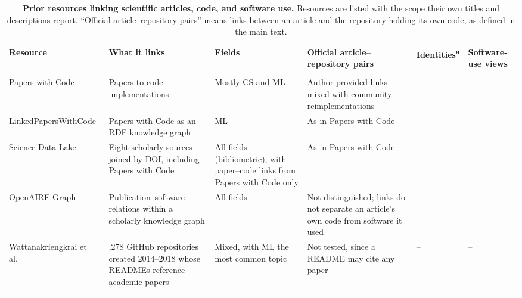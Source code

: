 \documentclass[pdflatex,sn-nature]{sn-jnl}%
\begin{document}
\begin{table}
\caption{\textbf{Prior resources linking scientific articles, code, and software use.} Resources are listed with the scope their own titles and descriptions report. ``Official article--repository pairs'' means links between an article and the repository holding its own code, as defined in the main text.}\label{stab:prior}
\footnotesize
\setlength{\tabcolsep}{3pt}
\renewcommand{\arraystretch}{1.1}
\begin{tabular}{@{}>{\raggedright\arraybackslash}p{84pt}>{\raggedright\arraybackslash}p{124pt}>{\raggedright\arraybackslash}p{92pt}>{\raggedright\arraybackslash}p{132pt}>{\centering\arraybackslash}p{40pt}>{\raggedright\arraybackslash}p{50pt}@{}}
\toprule
Resource & What it links & Fields & Official article--repository pairs & Identities\textsuperscript{a} & Software-use views \\
\midrule
\multicolumn{6}{@{}l}{\textit{Article--code links}}\\
\addlinespace[2pt]
Papers with Code & Papers to code implementations & Mostly CS and ML & Author-provided links mixed with community reimplementations & -- & -- \\ \addlinespace
Linked\-Papers\-With\-Code~\cite{farber2023linked} & Papers with Code as an RDF knowledge graph & ML & As in Papers with Code & -- & -- \\ \addlinespace
Science Data Lake~\cite{wilinski2026science} & Eight scholarly sources joined by DOI, including Papers with Code & All fields (bibliometric), with paper--code links from Papers with Code only & As in Papers with Code & -- & -- \\ \addlinespace
OpenAIRE Graph~\cite{manghi2019openaire} & Publication--software relations within a scholarly knowledge graph & All fields & Not distinguished; links do not separate an article's own code from software it used & -- & -- \\ \addlinespace
Wattanakriengkrai et al.~\cite{wattanakriengkrai2022github} & 20,278 GitHub repositories created 2014--2018 whose READMEs reference academic papers & Mixed, with ML the most common topic & Not tested, since a README may cite any paper & -- & -- \\ \addlinespace

\end{tabular}
\end{table}
\end{document}
